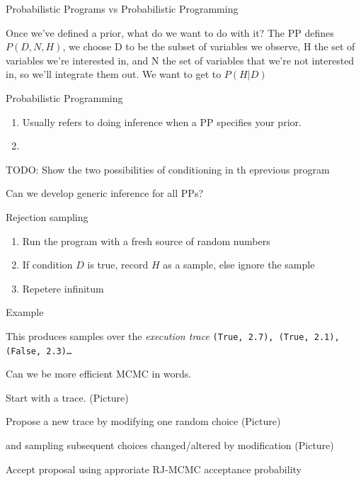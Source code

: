 \begin{frame}{Probabilistic Programs vs Probabilistic Programming}
  \begin{block}{Once we've defined a prior, what do we want to do with it?}  
  The PP defines $P(D,N,H)$, we choose D to be the subset of variables we observe, H the set of variables we're interested in, and N the set of variables that we're not interested in, so we'll integrate them out.  We want to get to $P(H|D)$
  \end{block}
      \begin{block}{Probabilistic Programming}
      \begin{enumerate}
        \item Usually refers to doing inference when a PP specifies your prior.
        \item 
      \end{enumerate}
    \end{block}
    TODO: Show the two possibilities of conditioning in th eprevious program
\end{frame}

\begin{frame}{Can we develop generic inference for all PPs?}
  \begin{block}{Rejection sampling}
    \begin{enumerate}
      \item Run the program with a fresh source of random numbers
      \item If condition $D$ is true, record $H$ as a sample, else ignore the sample
      \item Repetere infinitum
    \end{enumerate}
  \end{block}
  \begin{block}{Example}
    \vspace{0.5\baselineskip}
    \centering
    
  \end{block}
  \begin{block}{This produces samples over the \emph{execution trace}}
    \eg \texttt{(True, 2.7), (True, 2.1), (False, 2.3)\ldots}
  \end{block}
\end{frame}

\begin{frame}{Can we be more efficient}
MCMC in words.

Start with a trace. (Picture)

Propose a new trace by modifying one random choice (Picture)

and sampling subsequent choices changed/altered by modification (Picture)

Accept proposal using approriate RJ-MCMC acceptance probability

\end{frame}

